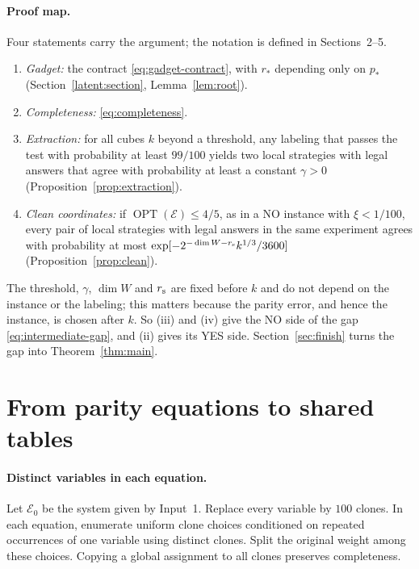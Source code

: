 \documentclass[11pt]{article}
\newcommand{\OPT}{\operatorname{OPT}}
\begin{document}
\paragraph{Proof map.}
Four statements carry the argument; the notation is defined in
Sections~2--5.
\begin{enumerate}[label=(\roman*)]
\item \emph{Gadget:} the contract \eqref{eq:gadget-contract}, with $r_*$
 depending only on $p_*$ (Section~\ref{latent:section}, Lemma~\ref{lem:root}).
\item \emph{Completeness:} \eqref{eq:completeness}.
\item \emph{Extraction:} for all cubes $k$ beyond a threshold, any labeling
 that passes the test with probability at least $99/100$ yields two local
 strategies with legal answers that agree with probability at least a
 constant $\gamma>0$ (Proposition~\ref{prop:extraction}).
\item \emph{Clean coordinates:} if $\OPT(\mathcal E)\le4/5$, as in a NO
 instance with $\xi<1/100$, every pair of local
 strategies with legal answers in the same experiment agrees with
 probability at most $\exp[-2^{-\dim W-r_{\rm s}}k^{1/3}/3600]$
 (Proposition~\ref{prop:clean}).
\end{enumerate}
The threshold, $\gamma$, $\dim W$ and $r_{\rm s}$ are fixed before $k$ and do not
depend on the instance or the labeling; this matters because the parity
error, and hence the instance, is chosen after $k$. So (iii) and (iv) give
the NO side of the gap \eqref{eq:intermediate-gap}, and (ii) gives its YES
side. Section~\ref{sec:finish} turns the gap
into Theorem~\ref{thm:main}.

\section{From parity equations to shared tables}\label{sec:tables}

\paragraph{Distinct variables in each equation.}
Let $\mathcal E_0$ be the system given by Input~1. Replace every variable by
$100$ clones. In each equation, enumerate uniform
clone choices conditioned on repeated occurrences of one variable using
distinct clones. Split the original weight among these choices. Copying
a global assignment to all clones preserves completeness.
\end{document}
